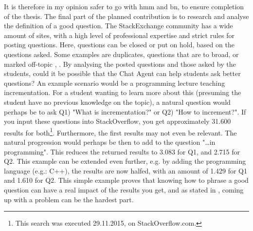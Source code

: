It is therefore in my opinion safer to go with \gls{hmm} and \gls{bn}, to ensure completion of the thesis.
\vspace{0.5em}\newline
The final part of the planned contribution is to research and analyse the definition of a good question. The StackExchange community has a wide amount of sites, with a high level 
of professional expertise and strict rules for posting questions. Here, questions can be closed or put on hold, based on the questions asked. Some examples are duplicates, questions 
that are to broad, or marked off-topic \cite{Stackoverflow.com2015}, \cite{CommunityWiki2015}. By analysing the posted questions and those asked by the students, could it be possible 
that the Chat Agent can help students ask better questions? An example scenario would be a programming lecture teaching incrementation. For a student wanting to learn more about this 
(presuming the student have no previous knowledge on the topic), a natural question would perhaps be to ask Q1) "What is incrementation?" or Q2) "How to increment?". If you input 
these questions into StackOverflow, you get approximately 31.600 results for both\footnote{This search was executed 29.11.2015, on StackOverflow.com.}. Furthermore, the first results 
may not even be relevant. The natural progression would perhaps be then to add to the question "\ldots in programming". This reduces the returned results to 3.083 for Q1, and 2.715 
for Q2. This example can be extended even further, e.g. by adding the programming language (e.g.: C++), the results are now halfed, with an amount of 1.429 for Q1 and 1.610 for Q2. 
This simple example proves that knowing how to phrase a good question can have a real impact of the results you get, and as stated in \cite{Lucky2015}, coming up with a problem can be 
the hardest part.